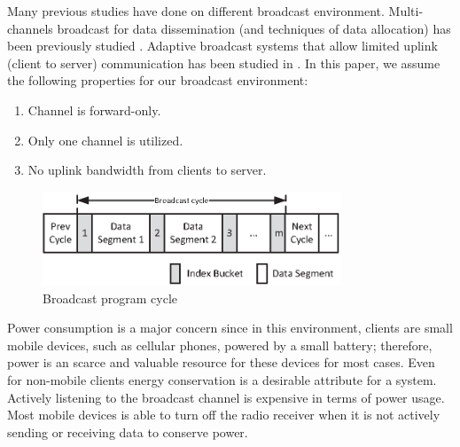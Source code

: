Many previous studies have done on different broadcast
environment. Multi-channels broadcast for data dissemination (and
techniques of data allocation) has been previously studied
\cite{DBLP:conf/cikm/HsuLC01} \cite{DBLP:conf/cikm/YeeN03}
\cite{DBLP:conf/mobicom/HameedV97}. Adaptive broadcast systems
that allow limited uplink (client to server) communication has
been studied in \cite{16350}. In this paper, we assume the
following properties for our broadcast environment:
\begin{enumerate}
\item Channel is forward-only. \item Only one channel is utilized.
\item No uplink bandwidth from clients to server.
\end{enumerate}


\begin{figure}[h]
\begin{center}
\includegraphics[width=3.5in]{Figures/bcast_cycle.eps}
\caption{\small Broadcast program cycle}
\label{fig:bcast_cycle}
\end{center}
\end{figure}

Power consumption is a major concern since in this environment,
clients are small mobile devices, such as cellular phones, powered
by a small battery; therefore, power is an scarce and valuable
resource for these devices for most cases. Even for non-mobile
clients energy conservation is a desirable attribute for a system.
Actively listening to the broadcast channel is expensive in terms
of power usage. Most mobile devices is able to turn off the radio
receiver when it is not actively sending or receiving data to
conserve power.

